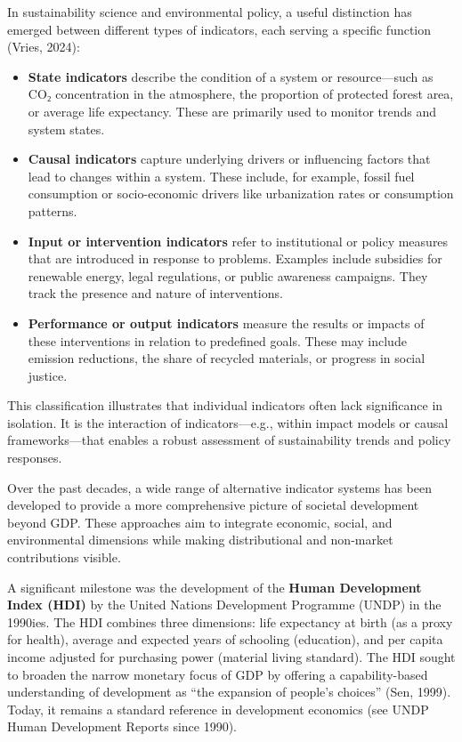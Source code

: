\documentclass[
  a4paper,
  openany]{book}
\begin{document}
In sustainability science and environmental policy, a useful distinction
has emerged between different types of indicators, each serving a
specific function (Vries, 2024):

\begin{itemize}
\item
  \textbf{State indicators} describe the condition of a system or
  resource---such as CO₂ concentration in the atmosphere, the proportion
  of protected forest area, or average life expectancy. These are
  primarily used to monitor trends and system states.
\item
  \textbf{Causal indicators} capture underlying drivers or influencing
  factors that lead to changes within a system. These include, for
  example, fossil fuel consumption or socio-economic drivers like
  urbanization rates or consumption patterns.
\item
  \textbf{Input or intervention indicators} refer to institutional or
  policy measures that are introduced in response to problems. Examples
  include subsidies for renewable energy, legal regulations, or public
  awareness campaigns. They track the presence and nature of
  interventions.
\item
  \textbf{Performance or output indicators} measure the results or
  impacts of these interventions in relation to predefined goals. These
  may include emission reductions, the share of recycled materials, or
  progress in social justice.
\end{itemize}

This classification illustrates that individual indicators often lack
significance in isolation. It is the interaction of indicators---e.g.,
within impact models or causal frameworks---that enables a robust
assessment of sustainability trends and policy responses.

Over the past decades, a wide range of alternative indicator systems has
been developed to provide a more comprehensive picture of societal
development beyond GDP. These approaches aim to integrate economic,
social, and environmental dimensions while making distributional and
non-market contributions visible.

A significant milestone was the development of the \textbf{Human
Development Index (HDI)} by the United Nations Development Programme
(UNDP) in the 1990ies. The HDI combines three dimensions: life
expectancy at birth (as a proxy for health), average and expected years
of schooling (education), and per capita income adjusted for purchasing
power (material living standard). The HDI sought to broaden the narrow
monetary focus of GDP by offering a capability-based understanding of
development as ``the expansion of people's choices'' (Sen, 1999). Today,
it remains a standard reference in development economics (see UNDP Human
Development Reports since 1990).
\end{document}
